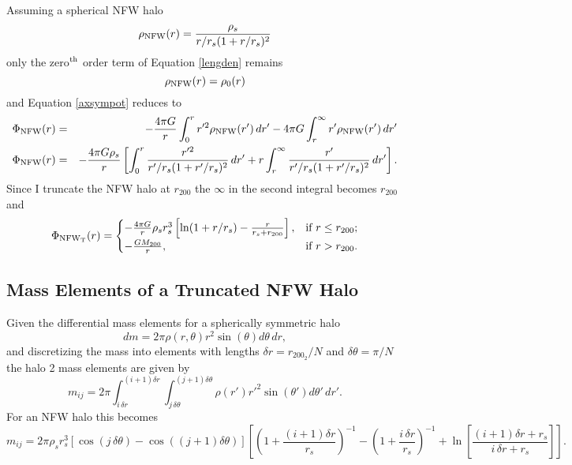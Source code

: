 Assuming a spherical NFW halo
\begin{displaymath}
\rho_{\rm NFW}(r) = \frac{\rho_s}{r/r_s(1+r/r_s)^2}
\end{displaymath}
only the zero$^{\rm th}$ order term of Equation \ref{lengden} remains
\begin{displaymath}
\rho_{\rm NFW}(r) = \rho_0(r)
\end{displaymath}
and Equation \ref{axsympot} reduces to
\begin{eqnarray}
\Phi_{\rm NFW}(r) & = & -\frac{4\pi G}{r}\int_{0}^{r} r'^2 \rho_{\rm NFW}(r')\,dr' - 4\pi G \int_{r}^{\infty}r' \rho_{\rm NFW}(r')\,dr' \nonumber\\
\Phi_{\rm NFW}(r) & = & -\frac{4\pi G \rho_s}{r} \left[ \int_{0}^{r} \frac{r'^2}{r'/r_s(1+r'/r_s)^2}\,dr' + r \int_{r}^{\infty} \frac{r'}{r'/r_s(1+r'/r_s)^2}\,dr' \right]. \nonumber
\end{eqnarray}
Since I truncate the NFW halo at $r_{200}$ the $\infty$ in the second integral becomes $r_{200}$ and
\begin{equation}
	\Phi_{\rm NFW_T}(r)=
	\begin{cases}
 		-\frac{4\pi G}{r} \rho_s r_s^3 \left[ \ln (1+r/r_s)-\frac{r}{r_s+r_{200}} \right], &\text{if $r\leq r_{200}$;}\\
  		-\frac{G M_{200}}{r}, &\text{if $r>r_{200}$.}
  	\end{cases}
\end{equation}

\subsection{Mass Elements of a Truncated NFW Halo}\label{masselements}

Given the differential mass elements for a spherically symmetric halo
\begin{displaymath}
dm = 2\pi\rho(r,\theta) r^2 \sin(\theta) d\theta\,dr,
\end{displaymath}
and discretizing the mass into elements with lengths $\delta r = r_{200_2}/N$ and $\delta\theta = \pi/N$ the halo 2 mass elements are given by
\begin{displaymath}
m_{ij} = 2\pi \int_{i\,\delta r}^{(i+1)\delta r} \int_{j\,\delta\theta}^{(j+1)\delta\theta} \rho(r') r'^2 \sin(\theta') d\theta'\,dr'.
\end{displaymath}
For an NFW halo this becomes
\begin{displaymath}
m_{ij} = 2\pi\rho_s r_s^3 \left[\cos(j\,\delta\theta)-\cos\left((j+1)\delta\theta\right) \right] \left[ \left( 1+\frac{(i+1)\delta r}{r_s}\right)^{-1} - \left(1+\frac{i\,\delta r}{r_s}\right)^{-1} + \ln\left[\frac{(i+1)\delta r+r_s}{i\,\delta r+r_s}\right]\right].
\end{displaymath}

